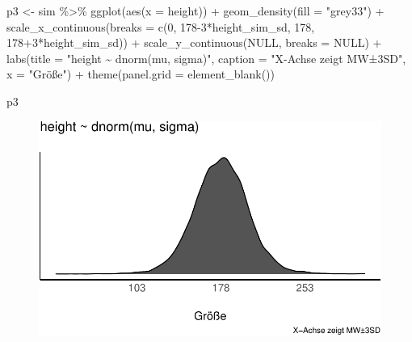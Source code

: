 \documentclass[
  a4paper,
  DIV=11]{scrreprt}
\newenvironment{Shaded}{\begin{snugshade}}{\end{snugshade}}
\newcommand{\AttributeTok}[1]{\textcolor[rgb]{0.40,0.45,0.13}{#1}}
\newcommand{\ConstantTok}[1]{\textcolor[rgb]{0.56,0.35,0.01}{#1}}
\newcommand{\DecValTok}[1]{\textcolor[rgb]{0.68,0.00,0.00}{#1}}
\newcommand{\FunctionTok}[1]{\textcolor[rgb]{0.28,0.35,0.67}{#1}}
\newcommand{\NormalTok}[1]{\textcolor[rgb]{0.00,0.23,0.31}{#1}}
\newcommand{\OtherTok}[1]{\textcolor[rgb]{0.00,0.23,0.31}{#1}}
\newcommand{\SpecialCharTok}[1]{\textcolor[rgb]{0.37,0.37,0.37}{#1}}
\newcommand{\StringTok}[1]{\textcolor[rgb]{0.13,0.47,0.30}{#1}}
\theoremstyle{definition}
\theoremstyle{remark}
\begin{document}
\begin{Shaded}
\begin{Highlighting}[]
\NormalTok{p3 }\OtherTok{\textless{}{-}} 
\NormalTok{  sim }\SpecialCharTok{\%\textgreater{}\%} 
  \FunctionTok{ggplot}\NormalTok{(}\FunctionTok{aes}\NormalTok{(}\AttributeTok{x =}\NormalTok{ height)) }\SpecialCharTok{+}
  \FunctionTok{geom\_density}\NormalTok{(}\AttributeTok{fill =} \StringTok{"grey33"}\NormalTok{) }\SpecialCharTok{+}
  \FunctionTok{scale\_x\_continuous}\NormalTok{(}\AttributeTok{breaks =} \FunctionTok{c}\NormalTok{(}\DecValTok{0}\NormalTok{, }\DecValTok{178{-}3}\SpecialCharTok{*}\NormalTok{height\_sim\_sd, }\DecValTok{178}\NormalTok{, }\DecValTok{178}\SpecialCharTok{+}\DecValTok{3}\SpecialCharTok{*}\NormalTok{height\_sim\_sd)) }\SpecialCharTok{+}
  \FunctionTok{scale\_y\_continuous}\NormalTok{(}\ConstantTok{NULL}\NormalTok{, }\AttributeTok{breaks =} \ConstantTok{NULL}\NormalTok{) }\SpecialCharTok{+}
  \FunctionTok{labs}\NormalTok{(}\AttributeTok{title =} \StringTok{"height \textasciitilde{} dnorm(mu, sigma)"}\NormalTok{,}
       \AttributeTok{caption =} \StringTok{"X{-}Achse zeigt MW±3SD"}\NormalTok{,}
       \AttributeTok{x =} \StringTok{"Größe"}\NormalTok{) }\SpecialCharTok{+}
  \FunctionTok{theme}\NormalTok{(}\AttributeTok{panel.grid =} \FunctionTok{element\_blank}\NormalTok{()) }

\NormalTok{p3}
\end{Highlighting}
\end{Shaded}

\begin{figure}[H]

{\centering \includegraphics{./gauss_files/figure-pdf/Kung-12-1.pdf}

}

\end{figure}
\end{document}
